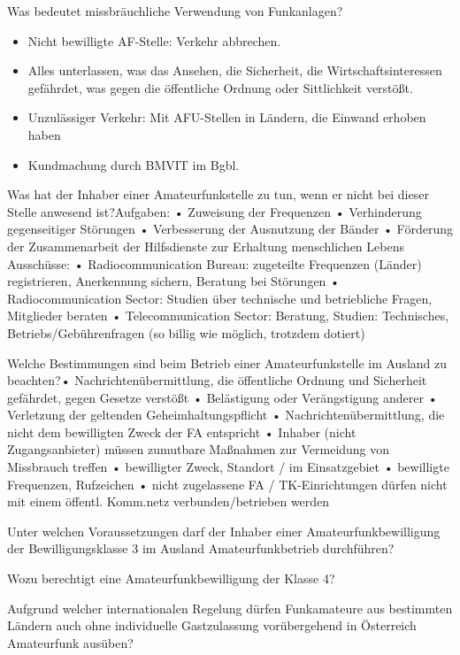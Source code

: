 \documentclass[avery5371,grid,frame,a4paper]{flashcards}
\newcommand{\card}[3]{
  \begin{flashcard}[{\chap} -- #1]{#2}#3\end{flashcard}
}
\begin{document}
\card{56}{Was bedeutet missbräuchliche Verwendung von Funkanlagen?}{\begin{itemize}\itemsep1pt \item Nicht bewilligte AF-Stelle: Verkehr abbrechen. \item Alles unterlassen, was das Ansehen, die Sicherheit, die Wirtschaftsinteressen gefährdet, was gegen die öffentliche Ordnung oder Sittlichkeit verstößt. \item Unzulässiger Verkehr: Mit AFU-Stellen in Ländern, die Einwand erhoben haben \item Kundmachung durch BMVIT im Bgbl.\end{itemize}}

\card{57}{Was hat der Inhaber einer Amateurfunkstelle zu tun, wenn er nicht bei dieser Stelle anwesend ist?}{\small{Aufgaben:
•  Zuweisung der Frequenzen
•  Verhinderung gegenseitiger Störungen
•  Verbesserung der Ausnutzung der Bänder
•  Förderung der Zusammenarbeit der Hilfsdienste zur Erhaltung menschlichen Lebens \\
Ausschüsse:
•  Radiocommunication Bureau: zugeteilte Frequenzen (Länder) registrieren, Anerkennung sichern, Beratung bei Störungen
•  Radiocommunication Sector: Studien über technische und betriebliche Fragen, Mitglieder beraten
•  Telecommunication Sector: Beratung, Studien: Technisches, Betriebs/Gebührenfragen (so billig wie möglich, trotzdem dotiert)}}

\card{58}{Welche Bestimmungen sind beim Betrieb einer Amateurfunkstelle im Ausland zu beachten?}{\small{• Nachrichtenübermittlung, die öffentliche Ordnung und Sicherheit gefährdet, gegen Gesetze verstößt
• Belästigung oder Verängstigung anderer
• Verletzung der geltenden Geheimhaltungspflicht
• Nachrichtenübermittlung, die nicht dem bewilligten Zweck der FA entspricht
• Inhaber (nicht Zugangsanbieter) müssen zumutbare Maßnahmen zur Vermeidung von Missbrauch treffen
• bewilligter Zweck, Standort / im Einsatzgebiet
• bewilligte Frequenzen, Rufzeichen
• nicht zugelassene FA / TK-Einrichtungen dürfen nicht mit einem öffentl. Komm.netz verbunden/betrieben werden}}

\card{59}{Unter welchen Voraussetzungen darf der Inhaber einer Amateurfunkbewilligung der Bewilligungsklasse 3 im Ausland Amateurfunkbetrieb durchführen?}{}

\card{60}{Wozu berechtigt eine Amateurfunkbewilligung der Klasse 4?}{}

\card{61}{Aufgrund welcher internationalen Regelung dürfen Funkamateure aus bestimmten Ländern auch ohne individuelle Gastzulassung vorübergehend in Österreich Amateurfunk ausüben?}{}
\end{document}

